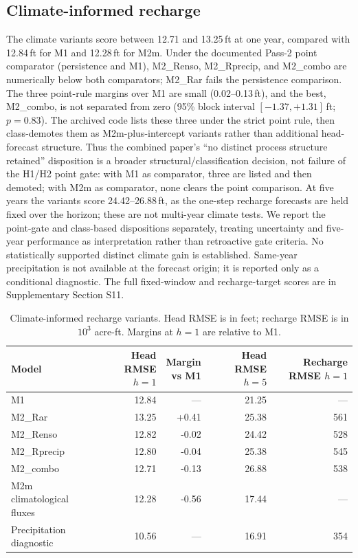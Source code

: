 \documentclass[11pt]{article}
\begin{document}
\subsection{Climate-informed recharge}

The climate variants score between 12.71 and 13.25\,ft at one year, compared with 12.84\,ft for M1 and 12.28\,ft for M2m. Under the documented Pass-2 point comparator (persistence and M1), M2\_Renso, M2\_Rprecip, and M2\_combo are numerically below both comparators; M2\_Rar fails the persistence comparison. The three point-rule margins over M1 are small (0.02--0.13\,ft), and the best, M2\_combo, is not separated from zero (95\% block interval \([-1.37,+1.31]\)\,ft; \(p=0.83\)). The archived code lists these three under the strict point rule, then class-demotes them as M2m-plus-intercept variants rather than additional head-forecast structure. Thus the combined paper's ``no distinct process structure retained'' disposition is a broader structural/classification decision, not failure of the H1/H2 point gate: with M1 as comparator, three are listed and then demoted; with M2m as comparator, none clears the point comparison. At five years the variants score 24.42--26.88\,ft, as the one-step recharge forecasts are held fixed over the horizon; these are not multi-year climate tests. We report the point-gate and class-based dispositions separately, treating uncertainty and five-year performance as interpretation rather than retroactive gate criteria. No statistically supported distinct climate gain is established. Same-year precipitation is not available at the forecast origin; it is reported only as a conditional diagnostic. The full fixed-window and recharge-target scores are in Supplementary Section S11.

\begin{table}[htbp]
\centering\small
\caption{Climate-informed recharge variants. Head RMSE is in feet; recharge RMSE is in \(10^3\) acre-ft. Margins at \(h=1\) are relative to M1.}
\label{tab:climate}
\begin{tabularx}{\textwidth}{@{}Xrrrr@{}}
\toprule
Model & \shortstack{Head RMSE\\$h=1$} & \shortstack{Margin\\vs M1} & \shortstack{Head RMSE\\$h=5$} & \shortstack{Recharge RMSE\\$h=1$} \\
\midrule
M1 & 12.84 & --- & 21.25 & --- \\
M2\_Rar & 13.25 & +0.41 & 25.38 & 561 \\
M2\_Renso & 12.82 & -0.02 & 24.42 & 528 \\
M2\_Rprecip & 12.80 & -0.04 & 25.38 & 545 \\
M2\_combo & 12.71 & -0.13 & 26.88 & 538 \\
M2m climatological fluxes & 12.28 & -0.56 & 17.44 & --- \\
Precipitation diagnostic & 10.56 & --- & 16.91 & 354 \\
\bottomrule
\end{tabularx}
\end{table}
\end{document}
